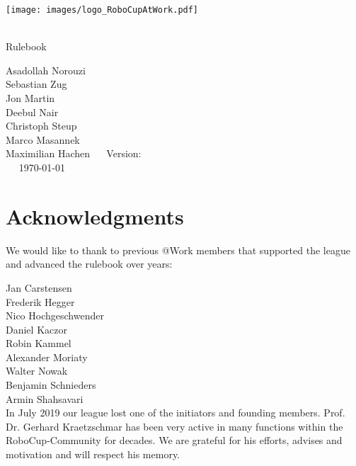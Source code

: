 
\begin{titlepage}
  \begin{center}
    {

      \texttt{[image: images/logo\_RoboCupAtWork.pdf]}\\[1.23ex]
    }
    \vspace{2.7 cm}
    \hrulefill\par
    {%
      \vspace*{.27cm}
      \Huge{\RCAW}\\[1.23ex]
      \Large Rulebook \\[2ex]
    }

    \hrulefill\par


    \vfill
    Asadollah Norouzi\\
  	Sebastian Zug\\
    Jon Martin \\
    Deebul Nair \\
    Christoph Steup \\
    Marco Masannek\\
    Maximilian Hachen
    \vfill
    ~~ Version: \YEAR ~~ \\
    ~~  \today ~~ \\
  \end{center}

\newpage

\section*{Acknowledgments}

We would like to thank to previous @Work members that supported the league and
advanced the rulebook over years:

Jan Carstensen \\
Frederik Hegger\\
Nico Hochgeschwender \\
Daniel Kaczor \\
Robin Kammel \\
Alexander Moriaty \\
Walter Nowak \\
Benjamin Schnieders\\
Armin Shahsavari \\

In July 2019 our league lost one of the initiators and founding members. Prof. Dr. Gerhard
Kraetzschmar has been very active in many functions within the RoboCup-Community
for decades. We are grateful for his efforts, advises and motivation and will respect his memory.


\end{titlepage}
